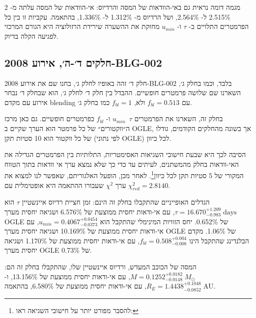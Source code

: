 \documentclass{article}
\begin{document}
\begin{multicols}{2}
מגמה דומה נראית גם באי-הוודאות של המסה והרדיוס:
אי-הוודאות של המסה עלתה מ-
\mbox{2.515\%}
ל-
\mbox{2.564\%},
ושל הרדיוס מ-
\mbox{1.312\%}
ל-
\mbox{1.336\%},
בהתאמה.
עקביות זו בין כל הפרמטרים התלויים ב-
$\tau$
ו-
$u_{min}$
מחזקת את ההשערה שירידת הרזולוציה היא הגורם המרכזי לפגיעה הקלה בדיוק.



\subsection*{חלקים ד׳-ה׳,
אירוע 
\mbox{2008-BLG-002}
}
חלק ד׳ זהה באופיו לחלק ג׳,
בחנו שם את אירוע
\mbox{2008-BLG-002} 
בלבד,
וכמו בחלק ג׳, השארנו שם שלושה פרמטרים חופשיים.
ההבדל בין חלק ד׳ לחלק ג׳, הוא שבחלק ד׳ נבחר אירוע עם 
מקדם 
\textenglish{blending}
עם 
$f_{bl}=0.513$
ולא,
$f_{bl}=1$
כמו בחלק ג׳.

בחלק זה,
השארנו את הפרמטרים
$\tau$\,
$u_{min}$
ו-
$f_{bl}$
כפרמטרים חופשיים.
גם כאן מרכז ה״ווקטורים״ של כל פרמטר הוא הערך שקיים ב
\textenglish{OGLE},
אך בשונה מהחלקים הקודמים,
גודלו של כל ווקטור הוא 
10
סטיות תקן
(לפי נתוני 
\textenglish{OGLE})
לכל כיוון.

הסיבה לכך היא שבעת חישובי השגיאות האסימטריות, התלותיות בין הפרמטרים הגדילה את האי-וודאות בחלק מהמשתנים,
לעיתים עד כדי כך שלא נמצא  ערך אי וודאות בתוך הטווח המקורי של
5 סטיות תקן לכל כיוון\footnote{
להסבר מפורט יותר על חישובי השגיאה ראו:
}.
לאחר מכן, הופעל האלגוריתם, שאפשר לנו למצוא את ערך 
$\chi^2$
שעבורו ההתאמה היא אופטימלית
עם 
$\chi^2_{red}=2.8140$.


הגדלים האופייניים שהתקבלו בחלק זה הינם:
זמן חציית רדיוס איינשטיין
$\tau$
הוא
\mbox{$\tau = 16.670^{+1.209}_{-0.983}\;\text{days}$},
עם אי-ודאות יחסית ממוצעת של
\mbox{6.576\%}
ושגיאה יחסית מערך
\textenglish{OGLE}
של
\mbox{0.652\%}.
יחס הזוויות המינימלי שהתקבל הוא
\mbox{$u_{min} = 0.4067^{+0.0454}_{-0.0373}$},
עם אי-ודאות יחסית ממוצעת של
\mbox{10.169\%}
ושגיאה יחסית מערך
\textenglish{OGLE}
של
\mbox{1.06\%}.
מקדם הבלנדינג שהתקבל הינו
\mbox{$f_{bl} = 0.508^{+0.004}_{-0.008}$},
עם אי-ודאות יחסית ממוצעת של
\mbox{1.170\%}
ושגיאה יחסית מערך
\textenglish{OGLE}
של
\mbox{0.73\%}.

המסה של הכוכב המעדש, ורדיוס איינשטיין שלו, שהתקבלו בחלק זה הם:
\mbox{$M = 0.1252^{+0.0182}_{-0.0148}\;M_{\odot}$},
עם אי-ודאות יחסית ממוצעת של
\mbox{13.156\%},
ו-
\mbox{$R_E = 1.4438^{+0.1048}_{-0.0852}\;\text{AU}$},
עם אי-ודאות יחסית ממוצעת של
\mbox{6.580\%},
בהתאמה.



\end{multicols}
\end{document}
